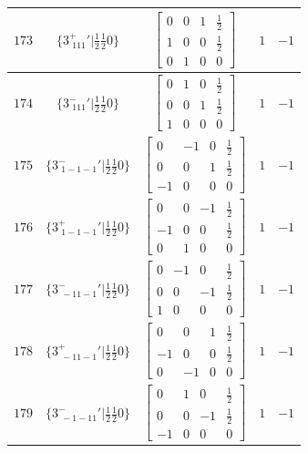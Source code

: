 \documentclass[fleqn,8pt]{jsarticle}
\begin{document}
\begin{longtable}{ccccc}
$ 173 $ & $ \{3^{+}_{\,\,111}{}'|\frac{1}{2} \frac{1}{2} 0\} $ & $ \begin{bmatrix} 0 & 0 & 1 & \frac{1}{2} \\ 1 & 0 & 0 & \frac{1}{2} \\ 0 & 1 & 0 & 0 \end{bmatrix} $ & $ 1 $ & $ -1 $ \\ \hline
$ 174 $ & $ \{3^{-}_{\,\,111}{}'|\frac{1}{2} \frac{1}{2} 0\} $ & $ \begin{bmatrix} 0 & 1 & 0 & \frac{1}{2} \\ 0 & 0 & 1 & \frac{1}{2} \\ 1 & 0 & 0 & 0 \end{bmatrix} $ & $ 1 $ & $ -1 $ \\ \hline
$ 175 $ & $ \{3^{-}_{\,\,1-1-1}{}'|\frac{1}{2} \frac{1}{2} 0\} $ & $ \begin{bmatrix} 0 & -1 & 0 & \frac{1}{2} \\ 0 & 0 & 1 & \frac{1}{2} \\ -1 & 0 & 0 & 0 \end{bmatrix} $ & $ 1 $ & $ -1 $ \\ \hline
$ 176 $ & $ \{3^{+}_{\,\,1-1-1}{}'|\frac{1}{2} \frac{1}{2} 0\} $ & $ \begin{bmatrix} 0 & 0 & -1 & \frac{1}{2} \\ -1 & 0 & 0 & \frac{1}{2} \\ 0 & 1 & 0 & 0 \end{bmatrix} $ & $ 1 $ & $ -1 $ \\ \hline
$ 177 $ & $ \{3^{-}_{\,\,-11-1}{}'|\frac{1}{2} \frac{1}{2} 0\} $ & $ \begin{bmatrix} 0 & -1 & 0 & \frac{1}{2} \\ 0 & 0 & -1 & \frac{1}{2} \\ 1 & 0 & 0 & 0 \end{bmatrix} $ & $ 1 $ & $ -1 $ \\ \hline
$ 178 $ & $ \{3^{+}_{\,\,-11-1}{}'|\frac{1}{2} \frac{1}{2} 0\} $ & $ \begin{bmatrix} 0 & 0 & 1 & \frac{1}{2} \\ -1 & 0 & 0 & \frac{1}{2} \\ 0 & -1 & 0 & 0 \end{bmatrix} $ & $ 1 $ & $ -1 $ \\ \hline
$ 179 $ & $ \{3^{-}_{\,\,-1-11}{}'|\frac{1}{2} \frac{1}{2} 0\} $ & $ \begin{bmatrix} 0 & 1 & 0 & \frac{1}{2} \\ 0 & 0 & -1 & \frac{1}{2} \\ -1 & 0 & 0 & 0 \end{bmatrix} $ & $ 1 $ & $ -1 $ \\ \hline

\end{longtable}
\end{document}
